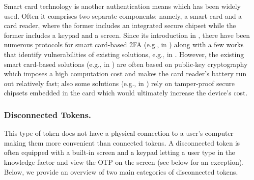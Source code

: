 Smart card technology is another authentication means which has been widely used. Often it comprises two separate components; namely, a smart card and a card reader, where the former includes an integrated secure chipset while the former includes a keypad and a screen. Since its introduction in \cite{chang1991remote}, there have been numerous protocols for smart card-based 2FA (e.g., in \cite{gupta2021machine,WangW18,radhakrishnan2022dependable}) along with a few works that identify vulnerabilities of existing solutions, e.g., in \cite{TianLHL20,WangGCW16,ChaturvediDMM16}. However, the existing smart card-based solutions (e.g., in \cite{gupta2021machine,WangW18,radhakrishnan2022dependable}) are often based on public-key cryptography which imposes a high computation cost and makes the card reader's battery run out relatively fast; also some solutions (e.g., in \cite{kim2009more}) rely on tamper-proof secure chipsets embedded in the card which would ultimately increase the device's cost. 







\subsubsection{Disconnected Tokens.}

This type of token does not have a physical connection to a user's computer making them more convenient than connected tokens. A disconnected token is often equipped with a built-in screen and a keypad letting a user type in the knowledge factor and view the OTP on the screen (see below for an exception).  Below, we provide an overview of two main categories of disconnected tokens.

